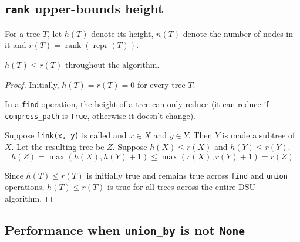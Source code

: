 \subsection{\texttt{rank} upper-bounds height}

For a tree $T$, let $h(T)$ denote its height, $n(T)$ denote the number of nodes in it
and $r(T) = \operatorname{rank}(\operatorname{repr}(T))$.

\begin{theorem} $h(T) \le r(T)$ throughout the algorithm. \end{theorem}
\begin{proof}
Initially, $h(T) = r(T) = 0$ for every tree $T$.

In a \texttt{find} operation, the height of a tree can only reduce
(it can reduce if \texttt{compress\_path} is \texttt{True},
otherwise it doesn't change).

Suppose \texttt{link(x, y)} is called and $x \in X$ and $y \in Y$.
Then $Y$ is made a subtree of $X$. Let the resulting tree be $Z$.
Suppose $h(X) \le r(X)$ and $h(Y) \le r(Y)$.
\[ h(Z) = \max(h(X), h(Y) + 1) \le \max(r(X), r(Y) + 1) = r(Z) \]

Since $h(T) \le r(T)$ is initially true and remains true across
\texttt{find} and \texttt{union} operations, $h(T) \le r(T)$
is true for all trees across the entire DSU algorithm.
\end{proof}

\subsection{Performance when \texttt{union\_by} is not \texttt{None}}

